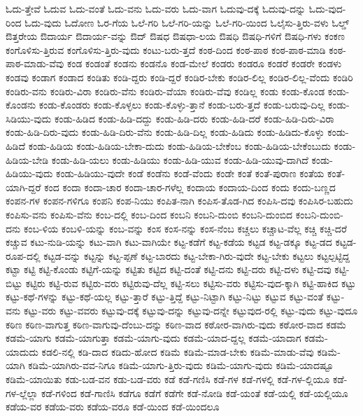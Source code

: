 {ಓದು-ತ್ತೇವೆ
ಓದುವ
ಓದು-ವಂತೆ
ಓದು-ವನು
ಓದು-ವರು
ಓದು-ವಾಗ
ಓದುವು-ದಕ್ಕೆ
ಓದುವು-ದನ್ನು
ಓದು-ವುದ-ರಿಂದ
ಓದು-ವುದು
ಓದೋಣ
ಓರ-ಗೆಯ
ಓಲೆ-ಗರಿ
ಓಲೆ-ಗರಿ-ಯನ್ನು
ಓಲೆ-ಗರಿ-ಯಿಂದ
ಓಲೈಸು-ತ್ತಿರು-ವಳು
ಓಲ್ಡ್
ಔತ್ತರೇಯ
ಔದಾರ್ಯ
ಔದಾರ್ಯ-ವನ್ನು
ಔದ್
ಔಷಧ
ಔಷಧಾ-ಲಯ
ಔಷಧಿ
ಔಷಧಿ-ಗಳಿಗೆ
ಔಷಧಿ-ಗಳು
ಕಂಕಣ
ಕಂಗೊಳಿಸು-ತ್ತಿರುವ
ಕಂಗೊಳಿಸು-ತ್ತಿರು-ವುದು
ಕಂಟು-ಬರು-ತ್ತದೆ
ಕಂಠ-ದಿಂದ
ಕಂಠ-ಪಾಠ
ಕಂಠ-ಪಾಠ-ಮಾಡಿ
ಕಂಠ-ಪಾಠ-ಮಾಡು-ವೆವು
ಕಂಡ
ಕಂಡಂತೆ
ಕಂಡನು
ಕಂಡನೊ
ಕಂಡ-ಮೇಲೆ
ಕಂಡರು
ಕಂಡರೂ
ಕಂಡರೆ
ಕಂಡರೇ
ಕಂಡಳು
ಕಂಡವು
ಕಂಡಾಗ
ಕಂಡಾದ
ಕಂಡಿತು
ಕಂಡಿ-ದ್ದರು
ಕಂಡಿ-ದ್ದರೆ
ಕಂಡಿರ-ಬೇಕು
ಕಂಡಿರ-ಲಿಲ್ಲ
ಕಂಡಿರ-ಲಿಲ್ಲ-ವೆಂದು
ಕಂಡಿರಿ
ಕಂಡಿರು-ವನು
ಕಂಡಿರು-ವಿರಾ
ಕಂಡಿರು-ವೆನು
ಕಂಡಿರು-ವೆಯಾ
ಕಂಡಿರು-ವೆವು
ಕಂಡಿಲ್ಲ
ಕಂಡು
ಕಂಡು-ಕೊಂಡ
ಕಂಡು-ಕೊಂಡನು
ಕಂಡು-ಕೊಂಡರು
ಕಂಡು-ಕೊಳ್ಳಲು
ಕಂಡು-ಕೊಳ್ಳು-ತ್ತಾನೆ
ಕಂಡು-ಬರು-ತ್ತದೆ
ಕಂಡು-ಬರುವು-ದಿಲ್ಲ
ಕಂಡು-ಸಿಡಿಯು-ವುದು
ಕಂಡು-ಹಿಡಿದ
ಕಂಡು-ಹಿಡಿ-ದದ್ದು
ಕಂಡು-ಹಿಡಿ-ದರು
ಕಂಡು-ಹಿಡಿ-ದರೆ
ಕಂಡು-ಹಿಡಿ-ದಿರು-ವಿರಾ
ಕಂಡು-ಹಿಡಿ-ದಿರು-ವುದು
ಕಂಡು-ಹಿಡಿ-ದಿರು-ವೆನು
ಕಂಡು-ಹಿಡಿ-ದಿಲ್ಲ
ಕಂಡು-ಹಿಡಿದು
ಕಂಡು-ಹಿಡಿದು-ಕೊಳ್ಳು
ಕಂಡು-ಹಿಡಿದೆ
ಕಂಡು-ಹಿಡಿಯ
ಕಂಡು-ಹಿಡಿಯ-ಬೇಕಾ-ದುದು
ಕಂಡು-ಹಿಡಿಯ-ಬೇಕೆಂಬ
ಕಂಡು-ಹಿಡಿಯ-ಬೇಕೆಂಬುದು
ಕಂಡು-ಹಿಡಿಯ-ಬೇಡಿ
ಕಂಡು-ಹಿಡಿ-ಯಲು
ಕಂಡು-ಹಿಡಿಯು
ಕಂಡು-ಹಿಡಿ-ಯುವ
ಕಂಡು-ಹಿಡಿ-ಯುವು-ದಾಗಿದೆ
ಕಂಡು-ಹಿಡಿಯು-ವುದು
ಕಂಡು-ಹಿಡಿಯು-ವುದೇ
ಕಂಡೆ
ಕಂಡೆನು
ಕಂಡೆ-ವೆಂದು
ಕಂಡೇ
ಕಂತೆ
ಕಂತೆ-ಪುರಾಣ
ಕಂತೆಯ
ಕಂತೆ-ಯಾಗಿ-ದ್ದರೆ
ಕಂದ
ಕಂದಾ
ಕಂದಾ-ಚಾರ
ಕಂದಾ-ಚಾರ-ಗಳೆಲ್ಲ
ಕಂದಾಯ
ಕಂದಾಯ-ದಿಂದ
ಕಂದು
ಕಂದು-ಬಣ್ಣದ
ಕಂಪನ-ಗಳ
ಕಂಪನ-ಗಳಿಗೂ
ಕಂಪನಿ
ಕಂಪ-ನಿಯು
ಕಂಪಿತ-ನಾಗಿ
ಕಂಪಿಸ-ತೊಡ-ಗಿದ
ಕಂಪಿಸಿ-ದವು
ಕಂಪಿಸಿರ-ಬಹುದು
ಕಂಪಿಸು-ವನು
ಕಂಪಿಸು-ವೆನು
ಕಂಬ-ದಲ್ಲಿ
ಕಂಬ-ದಿಂದ
ಕಂಬನಿ
ಕಂಬನಿ-ದುಂಬಿ
ಕಂಬನಿ-ದುಂಬಿದ
ಕಂಬನಿ-ದುಂಬಿ-ದನು
ಕಂಬ-ಳಿಯ
ಕಂಬಳಿ-ಯನ್ನು
ಕಂಬ-ವನ್ನು
ಕಂಸ
ಕಂಸ-ನನ್ನು
ಕಂಸ-ನೆಂಬ
ಕಚ್ಚಲು
ಕಚ್ಚಾಟ-ವೆಲ್ಲ
ಕಚ್ಚಿ
ಕಚ್ಚಿ-ದರೆ
ಕಚ್ಚುವ
ಕಟು-ನುಡಿ-ಯನ್ನು
ಕಟು-ವಾಗಿ
ಕಟು-ವಾಗಿಯೇ
ಕಟ್ಟ-ಕಡೆಗೆ
ಕಟ್ಟ-ಕಡೆಯ
ಕಟ್ಟಡ
ಕಟ್ಟ-ಡಕ್ಕೂ
ಕಟ್ಟ-ಡದ
ಕಟ್ಟಡ-ರೂಪ-ದಲ್ಲಿ
ಕಟ್ಟಡ-ವನ್ನು
ಕಟ್ಟನ್ನು
ಕಟ್ಟ-ಪ್ಪಣೆ
ಕಟ್ಟ-ಬಾರದು
ಕಟ್ಟ-ಬೇಕಾ-ಗಿರು-ವುದೇ
ಕಟ್ಟ-ಬೇಕು
ಕಟ್ಟಲು
ಕಟ್ಟಲ್ಪಟ್ಟಿದ್ದ
ಕಟ್ಟಾ
ಕಟ್ಟಿ
ಕಟ್ಟಿ-ಕೊಂಡು
ಕಟ್ಟಿಗೆ-ಯನ್ನು
ಕಟ್ಟಿತು
ಕಟ್ಟಿದ
ಕಟ್ಟಿ-ದಂತೆ
ಕಟ್ಟಿ-ದನು
ಕಟ್ಟಿ-ದರು
ಕಟ್ಟಿ-ದಳು
ಕಟ್ಟಿ-ದವು
ಕಟ್ಟಿ-ಬಿಟ್ಟು
ಕಟ್ಟಿರು
ಕಟ್ಟಿ-ರುವ
ಕಟ್ಟಿರು-ವರು
ಕಟ್ಟಿರುವು-ದೆಲ್ಲ
ಕಟ್ಟಿ-ಸಲು
ಕಟ್ಟಿಸು-ವರು
ಕಟ್ಟಿಸು-ವುದ-ಕ್ಕಾಗಿ
ಕಟ್ಟಿ-ಹಾಕಿದ
ಕಟ್ಟು
ಕಟ್ಟು-ಕಥೆ-ಗಳನ್ನು
ಕಟ್ಟು-ಕಥೆ-ಯಲ್ಲ
ಕಟ್ಟು-ತ್ತಾರೆ
ಕಟ್ಟು-ತ್ತಿದ್ದೆ
ಕಟ್ಟು-ನಿಟ್ಟಾಗಿ
ಕಟ್ಟು-ನಿಟ್ಟು
ಕಟ್ಟುವ
ಕಟ್ಟು-ವಂತೆ
ಕಟ್ಟು-ವನು
ಕಟ್ಟು-ವರು
ಕಟ್ಟು-ವವರು
ಕಟ್ಟುವು-ದಕ್ಕೆ
ಕಟ್ಟುವು-ದನ್ನು
ಕಟ್ಟುವು-ದನ್ನೇ
ಕಟ್ಟುವುದ-ರಲ್ಲಿ
ಕಟ್ಟು-ವುದು
ಕಟ್ಟು-ವುದೂ
ಕಠಿಣ
ಕಠಿಣ-ವಾಗುತ್ತ
ಕಠಿಣ-ವಾಗುವು-ದೆಂಬು-ದನ್ನು
ಕಠಿಣ-ವಾದ
ಕಠೋರ-ವಾಗಿರು-ವುದು
ಕಠೋರ-ವಾದ
ಕಡಮೆ
ಕಡಮೆ-ಯಾಗು
ಕಡಮೆ-ಯಾಗುತ್ತಾ
ಕಡಮೆ-ಯಾಗು-ವುದು
ಕಡಮೆ-ಯಾದ-ದ್ದಲ್ಲ
ಕಡಮೆ-ಯಾದಾಗ
ಕಡಮೆ-ಯಾದುದು
ಕಡಲಿ-ನಲ್ಲಿ
ಕಡಿ-ದಾದ
ಕಡಿದು-ಹೋದ
ಕಡಿಮೆ
ಕಡಿಮೆ-ಮಾಡ-ಬೇಕು
ಕಡಿಮೆ-ಮಾಡು-ವೆವು
ಕಡಿಮೆ-ಯಾಗಿ
ಕಡಿಮೆ-ಯಾಗಿರು-ವವ-ನಿಗೂ
ಕಡಿಮೆ-ಯಾಗು-ತ್ತಿರು-ವುದು
ಕಡಿಮೆ-ಯಾಗು-ವುದು
ಕಡಿಮೆ-ಯಾದಷ್ಟೂ
ಕಡಿಮೆ-ಯಾಯಿತು
ಕಡು-ಬಡ-ವನ
ಕಡು-ಬಡ-ವರು
ಕಡೆ
ಕಡೆ-ಗಣಿಸಿ
ಕಡೆ-ಗಳ
ಕಡೆ-ಗಳಲ್ಲಿ
ಕಡೆ-ಗಳ-ಲ್ಲಿಯೂ
ಕಡೆ-ಗಳ-ಲ್ಲೆಲ್ಲಾ
ಕಡೆ-ಗಳಿಂದ
ಕಡೆ-ಗಾಣಿಸಿ
ಕಡೆಗೂ
ಕಡೆಗೆ
ಕಡೆಗೇ
ಕಡೆ-ನೋಡಿ
ಕಡೆ-ಯಂತೆ
ಕಡೆ-ಯಲ್ಲಿ
ಕಡೆ-ಯಲ್ಲಿಯೂ
ಕಡೆಯ-ವರ
ಕಡೆಯ-ವರು
ಕಡೆಯ-ವರೂ
ಕಡೆ-ಯಿಂದ
ಕಡೆ-ಯಿಂದಲೂ
}
